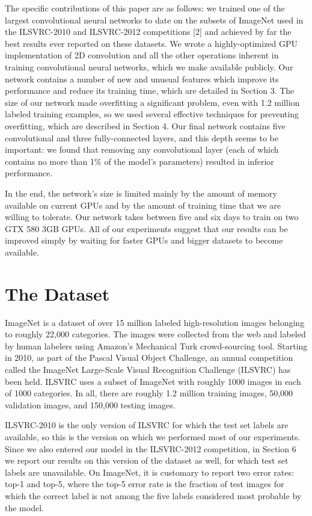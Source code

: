 \documentclass[12pt,a4paper,UTF8,twoside]{book}
\begin{document}
The specific contributions of this paper are as follows: we trained one of the largest convolutional neural networks to date on the subsets of ImageNet used in the ILSVRC-2010 and ILSVRC-2012 competitions {[}2{]} and achieved by far the best results ever reported on these datasets. We wrote a highly-optimized GPU implementation of 2D convolution and all the other operations inherent in training convolutional neural networks, which we make available publicly. Our network contains a number of new and unusual features which improve its performance and reduce its training time, which are detailed in Section 3. The size of our network made overfitting a significant problem, even with 1.2 million labeled training examples, so we used several effective techniques for preventing overfitting, which are described in Section 4. Our final network contains five convolutional and three fully-connected layers, and this depth seems to be important: we found that removing any convolutional layer (each of which contains no more than 1\% of the model's parameters) resulted in inferior performance.

In the end, the network's size is limited mainly by the amount of memory available on current GPUs and by the amount of training time that we are willing to tolerate. Our network takes between five and six days to train on two GTX 580 3GB GPUs. All of our experiments suggest that our results can be improved simply by waiting for faster GPUs and bigger datasets to become available.

\hypertarget{the-dataset}{%
\section{The Dataset}\label{the-dataset}}

ImageNet is a dataset of over 15 million labeled high-resolution images belonging to roughly 22,000 categories. The images were collected from the web and labeled by human labelers using Amazon's Mechanical Turk crowd-sourcing tool. Starting in 2010, as part of the Pascal Visual Object Challenge, an annual competition called the ImageNet Large-Scale Visual Recognition Challenge (ILSVRC) has been held. ILSVRC uses a subset of ImageNet with roughly 1000 images in each of 1000 categories. In all, there are roughly 1.2 million training images, 50,000 validation images, and 150,000 testing images.

ILSVRC-2010 is the only version of ILSVRC for which the test set labels are available, so this is the version on which we performed most of our experiments. Since we also entered our model in the ILSVRC-2012 competition, in Section 6 we report our results on this version of the dataset as well, for which test set labels are unavailable. On ImageNet, it is customary to report two error rates: top-1 and top-5, where the top-5 error rate is the fraction of test images for which the correct label is not among the five labels considered most probable by the model.
\end{document}
